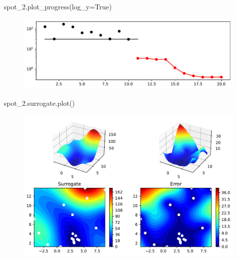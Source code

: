 \documentclass[
  letterpaper,
  DIV=11,
  numbers=noendperiod]{scrreprt}
\newenvironment{Shaded}{\begin{snugshade}}{\end{snugshade}}
\newcommand{\NormalTok}[1]{\textcolor[rgb]{0.00,0.23,0.31}{#1}}
\newcommand{\OperatorTok}[1]{\textcolor[rgb]{0.37,0.37,0.37}{#1}}
\newcommand{\VariableTok}[1]{\textcolor[rgb]{0.07,0.07,0.07}{#1}}
\begin{document}
\begin{Shaded}
\begin{Highlighting}[]
\NormalTok{spot\_2.plot\_progress(log\_y}\OperatorTok{=}\VariableTok{True}\NormalTok{)}
\end{Highlighting}
\end{Shaded}

\begin{figure}[H]

{\centering \includegraphics{04_spot_sklearn_surrogate_files/figure-pdf/cell-9-output-1.pdf}

}

\end{figure}

\begin{Shaded}
\begin{Highlighting}[]
\NormalTok{spot\_2.surrogate.plot()}
\end{Highlighting}
\end{Shaded}

\begin{figure}[H]

{\centering \includegraphics{04_spot_sklearn_surrogate_files/figure-pdf/cell-10-output-1.pdf}

}

\end{figure}
\end{document}
